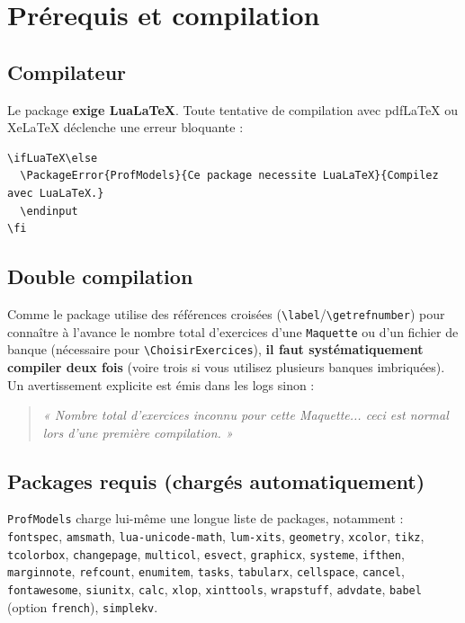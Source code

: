 \documentclass[11pt,a4paper]{article}
\newcommand{\pkg}[1]{\texttt{#1}}
\newcommand{\cmdname}[1]{\texttt{\textbackslash#1}}
\begin{document}
\section{Prérequis et compilation}

\subsection{Compilateur}

Le package \textbf{exige LuaLaTeX}. Toute tentative de compilation avec pdfLaTeX ou XeLaTeX déclenche une erreur bloquante :

\begin{lstlisting}
\ifLuaTeX\else
  \PackageError{ProfModels}{Ce package necessite LuaLaTeX}{Compilez avec LuaLaTeX.}
  \endinput
\fi
\end{lstlisting}

\subsection{Double compilation}

Comme le package utilise des références croisées (\cmdname{label}/\cmdname{getrefnumber}) pour connaître à l'avance le nombre total d'exercices d'une \texttt{Maquette} ou d'un fichier de banque (nécessaire pour \cmdname{ChoisirExercices}), \textbf{il faut systématiquement compiler deux fois} (voire trois si vous utilisez plusieurs banques imbriquées). Un avertissement explicite est émis dans les logs sinon :

\begin{quote}
\itshape « Nombre total d'exercices inconnu pour cette Maquette... ceci est normal lors d'une première compilation. »
\end{quote}

\subsection{Packages requis (chargés automatiquement)}

\pkg{ProfModels} charge lui-même une longue liste de packages, notamment :
\pkg{fontspec}, \pkg{amsmath}, \pkg{lua-unicode-math}, \pkg{lum-xits}, \pkg{geometry}, \pkg{xcolor}, \pkg{tikz}, \pkg{tcolorbox}, \pkg{changepage}, \pkg{multicol}, \pkg{esvect}, \pkg{graphicx}, \pkg{systeme}, \pkg{ifthen}, \pkg{marginnote}, \pkg{refcount}, \pkg{enumitem}, \pkg{tasks}, \pkg{tabularx}, \pkg{cellspace}, \pkg{cancel}, \pkg{fontawesome}, \pkg{siunitx}, \pkg{calc}, \pkg{xlop}, \pkg{xinttools}, \pkg{wrapstuff}, \pkg{advdate}, \pkg{babel} (option \texttt{french}), \pkg{simplekv}.
\end{document}
